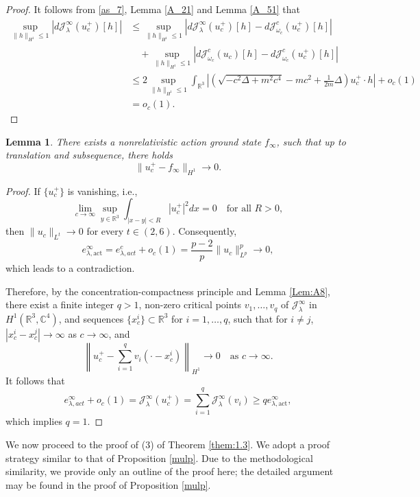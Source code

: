 \documentclass{amsart}
\theoremstyle{plain}
\newtheorem{lemma}[theorem]{Lemma}
\theoremstyle{definition}
\theoremstyle{remark}
\numberwithin{equation}{section} \numberwithin{figure}{section}
\begin{document}
\begin{proof}
    It follows from \eqref{as_7}, Lemma \ref{A_21} and Lemma \ref{A_51} that
    \begin{equation*}
        \begin{split}
            	\sup_{\|h\|_{H^1} \leq 1} |d\mathcal{J}^\infty_\lambda(u_c^+)[h]| &\leq
		\sup_{\|h\|_{H^1} \leq 1} |d\mathcal{J}^\infty_\lambda(u_c^+)[h] -
		d\mathcal{J}^c_{\omega_c}(u_c^+)[h]| \\
&\quad +\sup_{\|h\|_{H^1} \leq 1} |d\mathcal{J}^c_{\omega_c}(u_c)[h] -
		d\mathcal{J}^c_{\omega_c}(u_c^+)[h]|
        \\
		&\leq 2\sup_{\|h\|_{H^1} \leq 1} 
        \int_{\mathbb{R}^3}\left|\left(\sqrt{-c^2\Delta+m^2c^4}-mc^2+ \frac{1}{2m}\Delta\right)u_c^+ \cdot h\right| +o_c(1)
        \\
		&= o_c(1).
        \end{split}
    \end{equation*}
\end{proof}
\begin{lemma}\label{A_22}
    There exists a nonrelativistic action ground state $f_\infty$, such that up to translation and subsequence, there holds
    $$
    \|u_c^+- f_\infty\|_{H^1}\to 0.
    $$
\end{lemma}
\begin{proof}
  If $\{u_c^+\}$ is vanishing, i.e.,
  \[
      \lim_{c \to \infty} \sup_{y \in \mathbb{R}^3} \int_{|x - y| < R} |u_c^+|^2  dx = 0 \quad \text{for all } R > 0,
  \]
  then $\|u_c\|_{L^t} \to 0$ for every $t \in (2,6)$. Consequently,
  \[
      e_{\lambda, \text{act}}^\infty = e_{\lambda,act}^{c} + o_c(1) = \frac{p - 2}{p} \|u_c\|_{L^p}^p \to 0,
  \]
  which leads to a contradiction.

  Therefore, by the concentration-compactness principle and Lemma \ref{Lem:A8},
   there exist a finite integer $q > 1$, 
  non-zero critical points $v_1, \dots, v_q$ of $\mathcal{J}_{\lambda}^\infty$ 
  in $H^1(\mathbb{R}^3, \mathbb{C}^4)$, and sequences $\{x_c^i\} \subset \mathbb{R}^3$ 
  for $i = 1, \dots, q$, such that for $i \neq j$, $|x_c^i - x_c^j| \to \infty$ as $c \to \infty$, and
  \[
      \left\| u_c^+ - \sum_{i=1}^q v_i(\cdot - x_c^i) \right\|_{H^1} \to 0 \quad \text{as } c \to \infty.
  \]
  It follows that
  \[
      e_{\lambda,act}^{\infty} + o_c(1) = \mathcal{J}^\infty_\lambda(u_c^+) = \sum_{i=1}^q \mathcal{J}^\infty_\lambda(v_i) \geq q  e_{\lambda, \text{act}}^\infty,
  \]
  which implies $q = 1$.
\end{proof}
We now proceed to the proof of (3) of Theorem \ref{them:1.3}. We adopt a proof strategy similar to that of Proposition \ref{mulp}. Due to the methodological similarity, we provide only an outline of the proof here; the detailed argument may be found in the proof of Proposition \ref{mulp}.  
  
\end{document}

